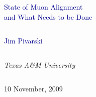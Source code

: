 \documentclass[compress]{beamer}
\begin{document}
\begin{frame}
\vfill
\begin{center}
\textcolor{darkblue}{\Large State of Muon Alignment \\ \vspace{0.2 cm} and What Needs to be Done}

\vfill
\begin{columns}
\begin{center}
\large
\textcolor{darkblue}{Jim Pivarski}
\end{center}
\end{columns}

\begin{columns}
\begin{center}
\scriptsize
{\it Texas A\&M University}
\end{center}
\end{columns}

\vfill
10 November, 2009

\end{center}
\end{frame}


\small
\end{document}
